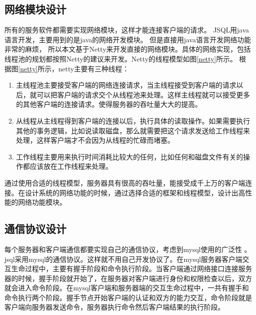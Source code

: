 \subsection{网络模块设计}
所有的服务软件都需要实现网络模块，这样才能连接客户端的请求。
JSQL用java语言开发，主要用到的是java的网络开发模块。
但是直接用java语言开发网络功能非常的麻烦，
所以本文基于Netty来开发直接的网络模块。具体的网络实现，包括
线程池的规划都按照Netty的建议来开发。Netty的线程模型如图\ref{netty}所示。
根据图\ref{netty}所示，netty主要有三种线程：
\begin{enumerate}[fullwidth,itemindent=2em,listparindent=2em]
	\item 主线程池主要接受客户端的网络连接请求，当主线程接受到客户端的请求以后，就可以把客户端的请求交个从线程池来处理。这样主线程就可以接受更多的其他客户端的连接请求。使得服务器的吞吐量大大的提高。
	\item 从线程从主线程得到客户端的连接以后，执行具体的读取操作。如果需要执行其他的事务逻辑，比如说读取磁盘，那么就需要把这个请求发送给工作线程来处理，这样客户端才不会因为从线程的忙碌而堵塞。
	\item 工作线程主要用来执行时间消耗比较大的任何，比如任何和磁盘文件有关的操作都应该放在工作线程来处理。
\end{enumerate}
通过使用合适的线程模型，服务器具有很高的吞吐量，能接受成千上万的客户端连接。在设计系统的网络功能的时候，通过选择合适的框架和线程模型，设计出高性能的网络功能模块。
\subsection{通信协议设计}
每个服务器和客户端通信都要实现自己的通信协议，考虑到mysql使用的广泛性
。jsql采用mysql的通信协议。这样就不用自己开发协议了。在mysql服务器客户端交互生命过程中，主要有握手阶段和命令执行阶段。当客户端通过网络接口连接服务器的时候，握手阶段就开始了，在服务器对客户端进行身份和权限检查以后，双方就会进入命令阶段。在mysql客户端和服务器端的交互生命过程中，一共有握手和命令执行两个阶段。握手节点开始客户端的认证和双方的能力交互，命令阶段就是客户端向服务器发送命令，服务器执行命令然后客户端结果的执行阶段。

